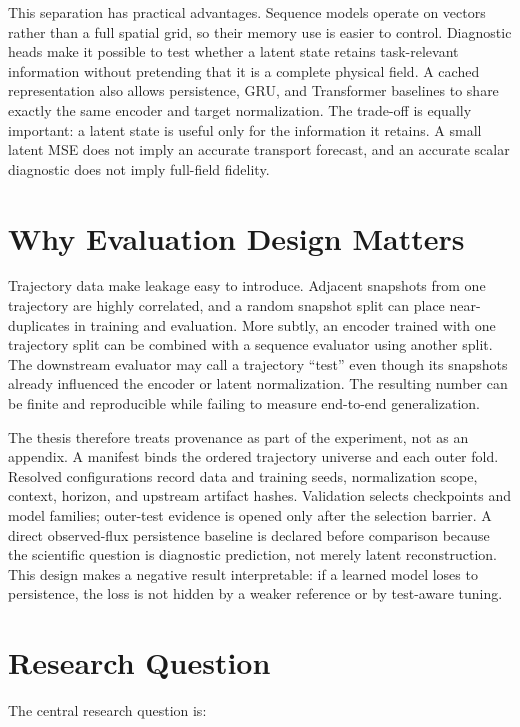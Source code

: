 This separation has practical advantages. Sequence models operate on vectors rather than a full
spatial grid, so their memory use is easier to control. Diagnostic heads make it possible to test
whether a latent state retains task-relevant information without pretending that it is a complete
physical field. A cached representation also allows persistence, GRU, and Transformer baselines to
share exactly the same encoder and target normalization. The trade-off is equally important: a
latent state is useful only for the information it retains. A small latent MSE does not imply an
accurate transport forecast, and an accurate scalar diagnostic does not imply full-field fidelity.

\section{Why Evaluation Design Matters}

Trajectory data make leakage easy to introduce. Adjacent snapshots from one trajectory are highly
correlated, and a random snapshot split can place near-duplicates in training and evaluation. More
subtly, an encoder trained with one trajectory split can be combined with a sequence evaluator
using another split. The downstream evaluator may call a trajectory ``test'' even though its
snapshots already influenced the encoder or latent normalization. The resulting number can be
finite and reproducible while failing to measure end-to-end generalization.

The thesis therefore treats provenance as part of the experiment, not as an appendix. A manifest
binds the ordered trajectory universe and each outer fold. Resolved configurations record data and
training seeds, normalization scope, context, horizon, and upstream artifact hashes. Validation
selects checkpoints and model families; outer-test evidence is opened only after the selection
barrier. A direct observed-flux persistence baseline is declared before comparison because the
scientific question is diagnostic prediction, not merely latent reconstruction. This design makes
a negative result interpretable: if a learned model loses to persistence, the loss is not hidden by
a weaker reference or by test-aware tuning.

\section{Research Question}

The central research question is:

